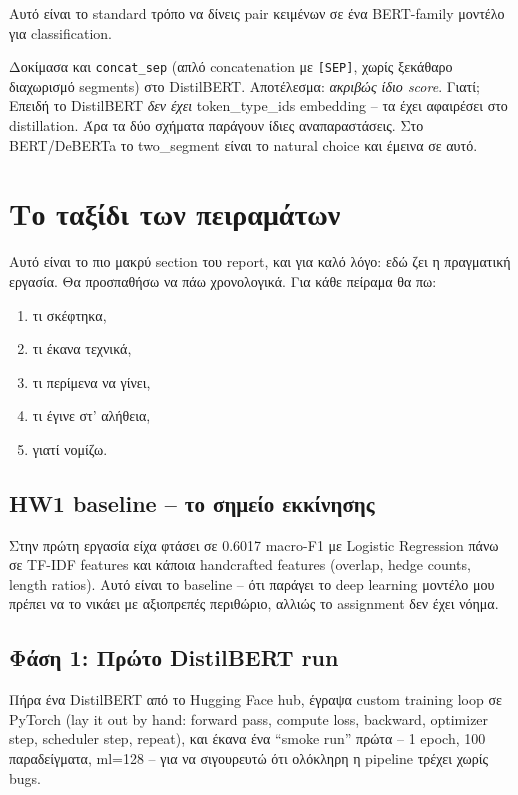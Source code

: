 \documentclass[12pt]{fphw}
\begin{document}
Αυτό είναι το standard τρόπο να δίνεις pair κειμένων σε ένα BERT-family μοντέλο για classification.

Δοκίμασα και \texttt{concat\_sep} (απλό concatenation με \texttt{[SEP]}, χωρίς ξεκάθαρο διαχωρισμό segments) στο DistilBERT. Αποτέλεσμα: \emph{ακριβώς ίδιο score}. Γιατί; Επειδή το DistilBERT \emph{δεν έχει} token\_type\_ids embedding -- τα έχει αφαιρέσει στο distillation. Άρα τα δύο σχήματα παράγουν ίδιες αναπαραστάσεις. Στο BERT/DeBERTa το two\_segment είναι το natural choice και έμεινα σε αυτό.

\section{Το ταξίδι των πειραμάτων}

Αυτό είναι το πιο μακρύ section του report, και για καλό λόγο: εδώ ζει η πραγματική εργασία. Θα προσπαθήσω να πάω χρονολογικά. Για κάθε πείραμα θα πω:

\begin{enumerate}
    \item τι σκέφτηκα,
    \item τι έκανα τεχνικά,
    \item τι περίμενα να γίνει,
    \item τι έγινε στ' αλήθεια,
    \item γιατί νομίζω.
\end{enumerate}

\subsection{HW1 baseline -- το σημείο εκκίνησης}

Στην πρώτη εργασία είχα φτάσει σε 0.6017 macro-F1 με Logistic Regression πάνω σε TF-IDF features και κάποια handcrafted features (overlap, hedge counts, length ratios). Αυτό είναι το baseline -- ότι παράγει το deep learning μοντέλο μου πρέπει να το νικάει με αξιοπρεπές περιθώριο, αλλιώς το assignment δεν έχει νόημα.

\subsection{Φάση 1: Πρώτο DistilBERT run}

Πήρα ένα DistilBERT από το Hugging Face hub, έγραψα custom training loop σε PyTorch (lay it out by hand: forward pass, compute loss, backward, optimizer step, scheduler step, repeat), και έκανα ένα ``smoke run'' πρώτα -- 1 epoch, 100 παραδείγματα, ml=128 -- για να σιγουρευτώ ότι ολόκληρη η pipeline τρέχει χωρίς bugs.
\end{document}
